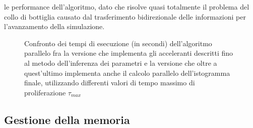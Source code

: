le performance dell'algoritmo, dato che risolve quasi totalmente il problema
del collo di bottiglia causato dal trasferimento bidirezionale delle informazioni
per l'avanzamento della simulazione.
\begin{figure}[t]
    \centering
    \caption{Confronto dei tempi di esecuzione (in secondi) dell'algoritmo
    parallelo fra la versione che implementa gli acceleranti descritti fino al
    metodo dell'inferenza dei parametri
    e la versione che oltre a quest'ultimo implementa anche il calcolo parallelo
    dell'istogramma finale,
    utilizzando differenti valori di tempo massimo di proliferazione
    $\tau_{max}$}
    \label{chart:inference-histogram}
\end{figure}

\subsection{Gestione della memoria}

